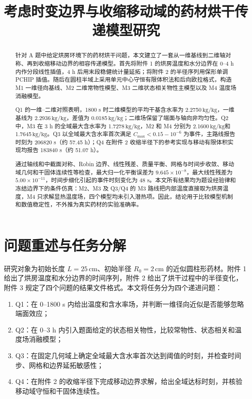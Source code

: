 \documentclass[withoutpreface,bwprint]{cumcmthesis}
\title{考虑时变边界与收缩移动域的药材烘干传递模型研究}
\newcommand{\kgkg}{\ensuremath{\mathrm{kg/kg}}}
\newcommand{\Cmax}{C_{\max}}
\begin{document}
\maketitle

\begin{abstract}
针对 A 题中给定烘房环境下的药材烘干问题，本文建立了一套从一维基线到二维轴对称、再到收缩移动边界的相容传递模型。首先将附件 1 的烘房温度和水分边界在 0--4 h 内作分段线性插值，4 h 后用末段稳健统计量延拓；将附件 2 的半径序列用保形单调 PCHIP 插值。随后在圆柱半域上采用单元中心守恒有限体积法和后向欧拉格式，构造 M1 一维径向基线、M2 二维常物性模型、M3 二维状态相关物性主模型以及 M4 温度场消融模型。

Q1 的一维--二维对照表明，1800 s 时二维模型的平均干基含水率为 2.2750\,\kgkg，一维基线为 2.2936\,\kgkg，差值为 0.0185\,\kgkg；二维场保留了端面与轴向非均匀性。Q2 中，M3 在 3 h 的全域最大含水率为 1.7278\,\kgkg，M2 和 M4 分别为 2.1600\,\kgkg 和 1.7645\,\kgkg。Q3 以全域最大含水率首次满足 \(\Cmax<0.15-10^{-6}\) 为事件，主路线报告时刻为 206820 s（约 57.45 h）；Q4 在附件 2 收缩半径下的参考实现与移动有限体积实现均报告 183840 s（约 51.07 h）。

通过轴线和中截面对称、Robin 边界、线性残差、质量平衡、网格与时间步收敛、移动域几何和干固体连续性等检查，最大归一化平衡误差为 \(9.645\times10^{-8}\)，最大线性残差为 \(5.00\times10^{-11}\)，时间步细化引起的事件时刻变化为 48 s。本文所有结果均为题设经验律和冻结边界下的条件仿真：M2、M3 及 Q3/Q4 的 M3 路线把内部温度直接取为烘房温度，M4 只求解显热温度场，四个模型均未引入潜热项。因此，结论用于比较模型机制和数值稳定性，不外推为真实药材的实验准确率。

\end{abstract}

\section{问题重述与任务分解}

研究对象为初始长度 \(L=25\,\mathrm{cm}\)、初始半径 \(R_0=2\,\mathrm{cm}\) 的近似圆柱形药材。附件 1 给出了烘房温度和水分边界的时间序列，附件 2 给出了烘干过程中的半径变化，附件 3 规定了四个问题的结果文件格式。本文将任务分为四个递进问题：

\begin{enumerate}[label=(\arabic*)]
  \item Q1：在 0--1800 s 内给出温度和含水率场，并判断一维径向近似是否能够忽略端面效应；
  \item Q2：在 0--3 h 内引入题面给定的状态相关物性，比较常物性、状态相关和温度场消融模型；
  \item Q3：在固定几何域上确定全域最大含水率首次达到阈值的时刻，并检查时间步、网格和边界延拓敏感性；
  \item Q4：在附件 2 的收缩半径下完成移动边界求解，给出全域达标时刻，并核验移动域守恒和干固体连续性。
\end{enumerate}
\end{document}
